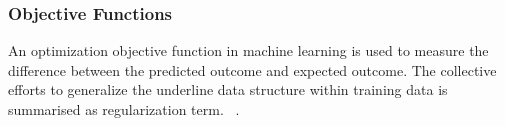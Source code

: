 \subsubsection{Objective Functions}
An optimization objective function in machine learning is used to measure the difference between the predicted outcome and expected outcome. The collective efforts to generalize the underline data structure within training data is summarised as regularization term. ~\cite{goodfellow_2015}.  